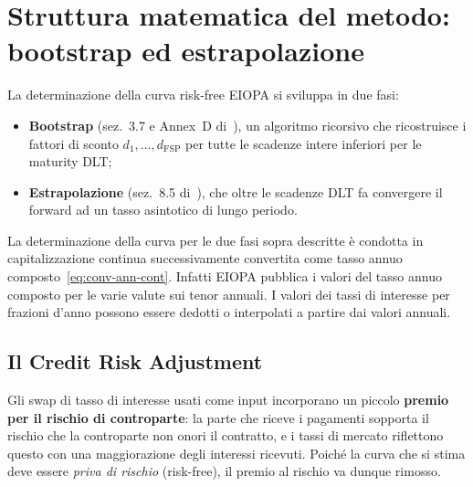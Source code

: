 \documentclass[11pt,a4paper]{article}
\theoremstyle{plain}
\theoremstyle{definition}
\theoremstyle{remark}
\newcommand{\UFR}{\mathrm{UFR}}
\newcommand{\FSP}{\mathrm{FSP}}
\begin{document}
\section{Struttura matematica del metodo: bootstrap ed estrapolazione}
\label{sec:metodo}

La determinazione della curva risk-free EIOPA si sviluppa in due fasi: \begin{itemize}
    \item \textbf{Bootstrap}
(sez.~3.7 e Annex~D di~\cite{eiopa2026}), un algoritmo ricorsivo che ricostruisce i fattori di
sconto $d_1,\ldots,d_{\FSP}$ per tutte le scadenze intere inferiori per le maturity DLT; %
\item \textbf{Estrapolazione}
(sez.~8.5 di~\cite{eiopa2026}), che oltre le scadenze DLT fa convergere il forward ad un tasso asintotico di lungo periodo. %
\end{itemize}  
La determinazione della curva per le due fasi sopra descritte \`e condotta in capitalizzazione continua 
successivamente convertita come tasso annuo composto~\eqref{eq:conv-ann-cont}. 
Infatti EIOPA pubblica i valori del tasso annuo composto per le varie valute sui tenor annuali. 
I valori dei tassi di interesse per frazioni d'anno possono essere dedotti o interpolati 
a partire dai valori annuali.

\subsection{Il Credit Risk Adjustment}
\label{sec:cra}

Gli swap di tasso di interesse usati come input incorporano un piccolo \textbf{premio
per il rischio di controparte}: la parte che riceve i pagamenti sopporta il rischio che la
controparte non onori il contratto, e i tassi di mercato riflettono questo con una maggiorazione degli interessi ricevuti.
Poich\'e la curva che si stima deve essere \emph{priva di rischio} (risk-free), 
il premio al rischio va dunque rimosso.
\end{document}
